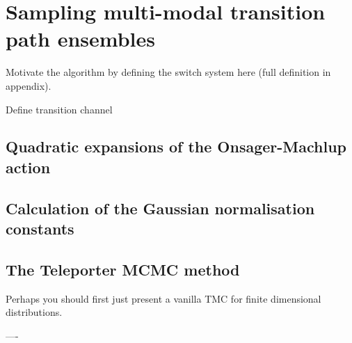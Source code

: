 

\section{Sampling multi-modal transition path ensembles} \label{sec:Teleporter MCMC}

Motivate the algorithm by defining the switch system here (full definition in appendix).

Define transition channel

\subsection{Quadratic expansions of the Onsager-Machlup action}

\subsection{Calculation of the Gaussian normalisation constants}

\subsection{The Teleporter MCMC method}


Perhaps you should first just present a vanilla TMC for finite dimensional distributions.

----

